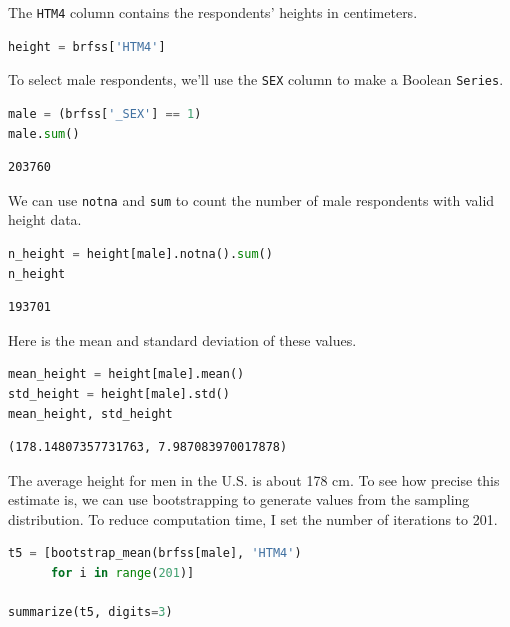 The \passthrough{\lstinline!HTM4!} column contains the respondents'
heights in centimeters.

\begin{lstlisting}[language=Python,style=source]
height = brfss['HTM4']
\end{lstlisting}

To select male respondents, we'll use the \passthrough{\lstinline!SEX!}
column to make a Boolean \passthrough{\lstinline!Series!}.

\begin{lstlisting}[language=Python,style=source]
male = (brfss['_SEX'] == 1)
male.sum()
\end{lstlisting}

\begin{lstlisting}[style=output]
203760
\end{lstlisting}

We can use \passthrough{\lstinline!notna!} and
\passthrough{\lstinline!sum!} to count the number of male respondents
with valid height data.

\begin{lstlisting}[language=Python,style=source]
n_height = height[male].notna().sum()
n_height
\end{lstlisting}

\begin{lstlisting}[style=output]
193701
\end{lstlisting}

Here is the mean and standard deviation of these values.

\begin{lstlisting}[language=Python,style=source]
mean_height = height[male].mean()
std_height = height[male].std()
mean_height, std_height
\end{lstlisting}

\begin{lstlisting}[style=output]
(178.14807357731763, 7.987083970017878)
\end{lstlisting}

The average height for men in the U.S. is about 178 cm. To see how
precise this estimate is, we can use bootstrapping to generate values
from the sampling distribution. To reduce computation time, I set the
number of iterations to 201.

\begin{lstlisting}[language=Python,style=source]
t5 = [bootstrap_mean(brfss[male], 'HTM4')
      for i in range(201)]

summarize(t5, digits=3)
\end{lstlisting}

